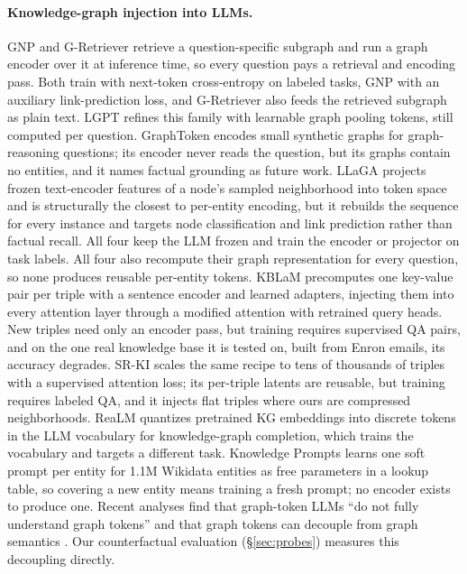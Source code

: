 \documentclass{article}
\begin{document}
\paragraph{Knowledge-graph injection into LLMs.} GNP \citep{gnp} and G-Retriever
\citep{gretriever} retrieve a question-specific subgraph and run a graph encoder over it at
inference time, so every question pays a retrieval and encoding pass. Both train with
next-token cross-entropy on labeled tasks, GNP with an auxiliary link-prediction loss, and
G-Retriever also feeds the retrieved subgraph as plain text. LGPT \citep{lgpt} refines this
family with learnable graph pooling tokens, still computed per question. GraphToken
\citep{graphtoken}
encodes small synthetic graphs for graph-reasoning questions; its encoder never reads the
question, but its graphs contain no entities, and it names factual grounding as future work.
LLaGA \citep{llaga} projects frozen text-encoder features of a node's sampled neighborhood
into token space and is structurally the closest to per-entity encoding, but it rebuilds the
sequence for every instance and targets node classification and link prediction rather than
factual recall. All four keep the LLM frozen and train the encoder or projector on task
labels. All four also recompute their graph representation for every question, so none
produces reusable per-entity tokens.
KBLaM \citep{kblam} precomputes one key-value pair per triple with a sentence encoder and
learned adapters, injecting them into every attention layer through a modified attention with
retrained query heads. New triples need only an encoder pass, but training requires
supervised QA pairs, and on the one real knowledge base it is tested on, built from Enron
emails, its accuracy degrades. SR-KI \citep{srki} scales the same recipe to tens of thousands
of triples with a supervised attention loss; its per-triple latents are reusable, but
training requires labeled QA, and it injects flat triples where ours are compressed
neighborhoods. ReaLM \citep{realm} quantizes pretrained KG embeddings into discrete tokens in
the LLM vocabulary for knowledge-graph completion, which trains the vocabulary and targets a
different task. Knowledge Prompts \citep{knowledgeprompts} learns one soft
prompt per entity for 1.1M Wikidata entities as free parameters in a lookup table, so
covering a new entity means training a fresh prompt; no encoder exists to produce one. Recent
analyses find that graph-token LLMs ``do not fully understand graph tokens'' \citep{gteval}
and that graph tokens can decouple from graph semantics \citep{sink}. Our counterfactual
evaluation (\S\ref{sec:probes}) measures this decoupling directly.
\end{document}
